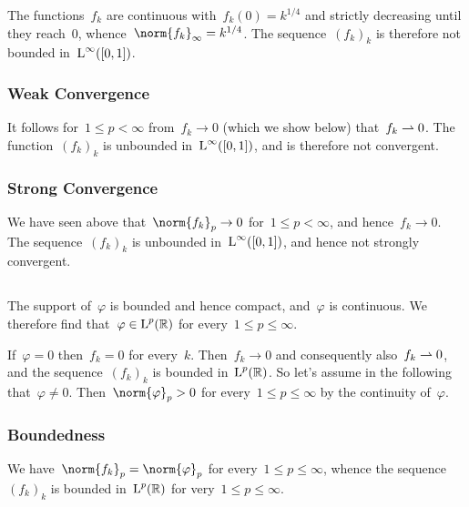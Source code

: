 The functions~$f_k$ are continuous with~$f_k(0) = k^{1/4}$ and strictly decreasing until they reach~$0$, whence~$\norm{f_k}_\infty = k^{1/4}$.
The sequence~$(f_k)_k$ is therefore not bounded in~$\operatorname{L}^\infty([0,1])$.



\subsubsection{Weak Convergence}

It follows for~$1 \leq p < \infty$ from~$f_k \to 0$ (which we show below) that~$f_k \rightharpoonup 0$.
The function~$(f_k)_k$ is unbounded in~$\operatorname{L}^\infty([0,1])$, and is therefore not {\weaklystar} convergent.



\subsubsection{Strong Convergence}

We have seen above that~$\norm{f_k}_p \to 0$ for~$1 \leq p < \infty$, and hence~$f_k \to 0$.
The sequence~$(f_k)_k$ is unbounded in~$\operatorname{L}^\infty([0,1])$, and hence not strongly convergent.





\subsection{}

The support of~$\varphi$ is bounded and hence compact, and~$\varphi$ is continuous.
We therefore find that~$\varphi \in \operatorname{L}^p(\mathbb{R})$ for every~$1 \leq p \leq \infty$.

If~$\varphi = 0$ then~$f_k = 0$ for every~$k$.
Then~$f_k \to 0$ and consequently also~$f_k \rightharpoonup 0$, and the sequence~$(f_k)_k$ is bounded in~$\operatorname{L}^p(\mathbb{R})$.
So let’s assume in the following that~$\varphi \neq 0$.
Then~$\norm{\varphi}_p > 0$ for every~$1 \leq p \leq \infty$ by the continuity of~$\varphi$.



\subsubsection{Boundedness}

We have~$\norm{f_k}_p =  \norm{\varphi}_p$ for every~$1 \leq p \leq \infty$, whence the sequence~$(f_k)_k$ is bounded in~$\operatorname{L}^p(\mathbb{R})$ for very~$1 \leq p \leq \infty$.



